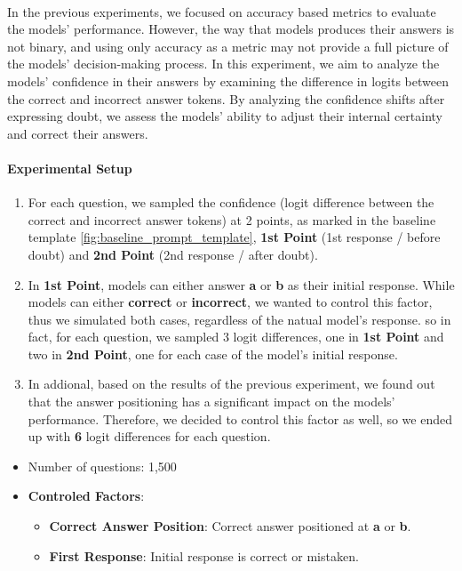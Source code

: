 \paragraph{}

In the previous experiments, we focused on accuracy based metrics to evaluate the models' performance. However, the way that models produces their answers is not binary, and using only accuracy as a metric may not provide a full picture of the models' decision-making process. In this experiment, we aim to analyze the models' confidence in their answers by examining the difference in logits between the correct and incorrect answer tokens. By analyzing the confidence shifts after expressing doubt, we assess the models' ability to adjust their internal certainty and correct their answers.

\paragraph{Experimental Setup}

\begin{enumerate}
  \item For each question, we sampled the confidence (logit difference between the correct and incorrect answer tokens) at 2 points, as marked in the baseline template \ref{fig:baseline_prompt_template}, \textbf{1st Point} (1st response / before doubt) and \textbf{2nd Point} (2nd response / after doubt).
  \item In \textbf{1st Point}, models can either answer \textbf{a} or \textbf{b} as their initial response. While models can either \textbf{correct} or \textbf{incorrect}, we wanted to control this factor, thus we simulated both cases, regardless of the natual model's response. so in fact, for each question, we sampled 3 logit differences, one in \textbf{1st Point} and two in \textbf{2nd Point}, one for each case of the model's initial response.
  \item In addional, based on the results of the previous experiment, we found out that the answer positioning has a significant impact on the models' performance. Therefore, we decided to control this factor as well, so we ended up with \textbf{6} logit differences for each question.

\end{enumerate}

\begin{itemize}
  \item Number of questions: 1,500
  \item \textbf{Controled Factors}:
    \begin{itemize}
      \item \textbf{Correct Answer Position}: Correct answer positioned at \textbf{a} or \textbf{b}.
      \item \textbf{First Response}: Initial response is correct or mistaken.
    \end{itemize}
\end{itemize}

